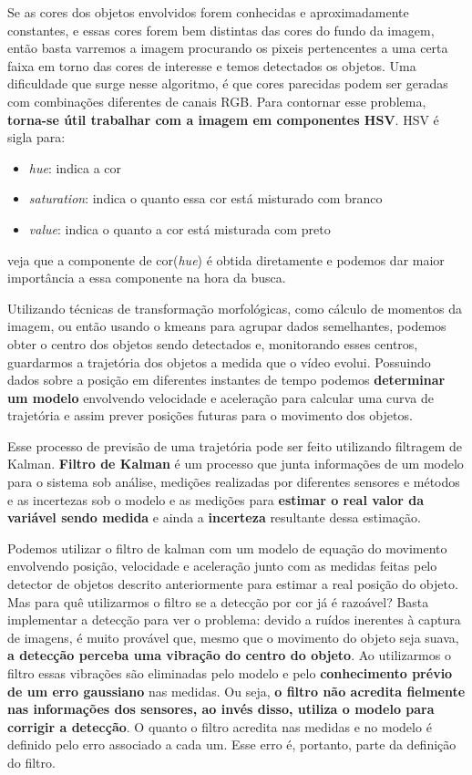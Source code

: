 \documentclass[journal]{IEEEtran}
\begin{document}
Se as cores dos objetos envolvidos forem conhecidas e aproximadamente 
constantes, e essas cores forem bem distintas das cores do fundo da 
imagem, então basta varremos a imagem procurando os pixeis 
pertencentes a uma certa faixa em torno das cores de interesse e 
temos detectados os objetos.
Uma dificuldade que surge nesse algoritmo, é que cores parecidas podem
ser geradas com combinações diferentes de canais RGB. Para contornar 
esse problema, \textbf{torna-se
útil trabalhar com a imagem em componentes HSV}. HSV é sigla para:
\begin{itemize}
 \item 
 \textit{hue}: indica a cor
 \item 
 \textit{saturation}: indica o quanto essa cor está misturado com 
branco
 \item
 \textit{value}: indica o quanto a cor está misturada com preto
\end{itemize}
veja que a componente de cor(\textit{hue}) é obtida diretamente e 
podemos dar maior importância a essa componente na hora da busca.


Utilizando técnicas de transformação morfológicas, como cálculo de 
momentos da imagem, ou então usando o kmeans para agrupar dados 
semelhantes, podemos obter o centro dos objetos sendo detectados e,
monitorando esses centros, guardarmos a trajetória dos objetos a 
medida que o vídeo evolui. Possuindo dados sobre a posição em 
diferentes instantes de tempo podemos \textbf{determinar um modelo} 
envolvendo velocidade e aceleração para calcular uma curva de 
trajetória e assim prever posições futuras para o movimento dos 
objetos.

Esse processo de previsão de uma trajetória pode ser feito utilizando
filtragem de Kalman. \textbf{Filtro de Kalman} é um processo que 
junta informações de um modelo para o sistema sob análise, medições 
realizadas por diferentes sensores e métodos e as incertezas sob o 
modelo e as medições para \textbf{estimar o real valor da variável 
sendo 
medida} e ainda a \textbf{incerteza} resultante dessa estimação.

Podemos
utilizar o filtro de kalman com um modelo de equação do movimento 
envolvendo posição, velocidade e aceleração junto com as medidas 
feitas pelo detector de objetos descrito anteriormente para estimar a 
real posição do objeto. Mas para quê 
utilizarmos o filtro se a detecção por cor já é razoável? Basta 
implementar a detecção para ver o problema: devido a ruídos inerentes
à captura de imagens, é muito provável que, mesmo que o movimento do 
objeto seja suava, \textbf{a detecção perceba uma vibração do centro 
do 
objeto}. Ao utilizarmos o filtro essas vibrações são eliminadas pelo 
modelo e pelo \textbf{conhecimento prévio de um erro gaussiano} nas 
medidas.
Ou seja, \textbf{o filtro não acredita fielmente nas informações dos 
sensores,
ao invés disso, utiliza o modelo para corrigir a detecção}. O quanto 
o filtro acredita nas medidas e no modelo é definido pelo erro 
associado a cada um. Esse erro é, portanto, parte da definição do 
filtro.
\end{document}

